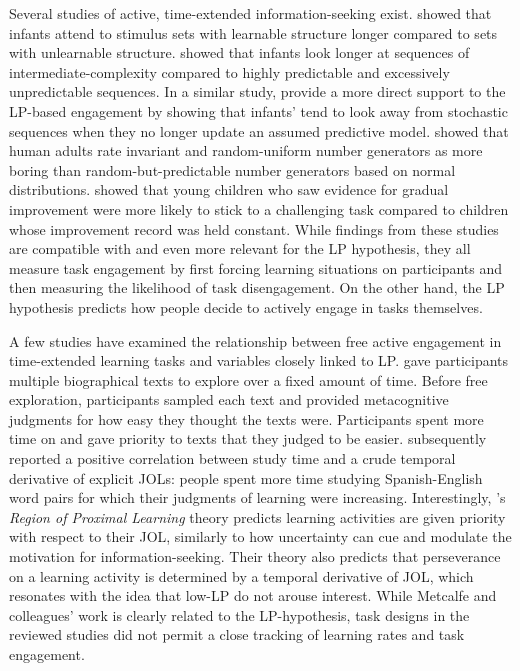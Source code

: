 Several studies of active, time-extended information-seeking exist. \citeauthor{gerken_infants_2011} \citeyearpar{gerken_infants_2011} showed that infants attend to stimulus sets with learnable structure longer compared to sets with unlearnable structure. \citeauthor{kidd_goldilocks_2012} \citeyearpar{kidd_goldilocks_2012} showed that infants look longer at sequences of intermediate-complexity compared to highly predictable and excessively unpredictable sequences. In a similar study, \citeauthor{poli_infants_2020} \citeyearpar{poli_infants_2020} provide a more direct support to the \ac{LP}-based engagement by showing that infants' tend to look away from stochastic sequences when they no longer update an assumed predictive model. \citeauthor{geana_boredom_2016} \citeyearpar{geana_boredom_2016} showed that human adults rate invariant and random-uniform number generators as more boring than random-but-predictable number generators based on normal distributions. \citeauthor{leonard_young_2021} \citeyearpar{leonard_young_2021} showed that young children who saw evidence for gradual improvement were more likely to stick to a challenging task compared to children whose improvement record was held constant. While findings from these studies are compatible with and even more relevant for the \ac{LP} hypothesis, they all measure task engagement by first forcing learning situations on participants and then measuring the likelihood of task disengagement. On the other hand, the \ac{LP} hypothesis predicts how people decide to actively engage in tasks themselves.

A few studies have examined the relationship between free active engagement in time-extended learning tasks and variables closely linked to \ac{LP}. \citeauthor{son_metacognitive_2000} \citeyearpar{son_metacognitive_2000} gave participants multiple biographical texts to explore over a fixed amount of time. Before free exploration, participants sampled each text and provided metacognitive judgments for how easy they thought the texts were. Participants spent more time on and gave priority to texts that they judged to be easier. \citeauthor{metcalfe_region_2005} \citeyearpar{metcalfe_region_2005} subsequently reported a positive correlation between study time and a crude temporal derivative of explicit \acp{JOL}: people spent more time studying Spanish-English word pairs for which their judgments of learning were increasing. Interestingly, \citeauthor{metcalfe_region_2005}'s \emph{Region of Proximal Learning} theory \parencite{metcalfe_region_2005} predicts learning activities are given priority with respect to their \ac{JOL}, similarly to how uncertainty can cue and modulate the motivation for information-seeking. Their theory also predicts that perseverance on a learning activity is determined by a temporal derivative of \ac{JOL}, which resonates with the idea that low-\ac{LP} do not arouse interest. While Metcalfe and colleagues' work is clearly related to the \ac{LP}-hypothesis, task designs in the reviewed studies did not permit a close tracking of learning rates and task engagement.

